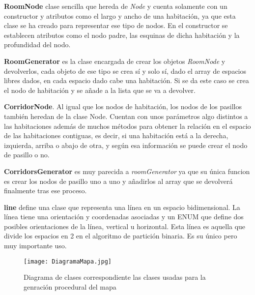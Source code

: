 \textbf{RoomNode} clase sencilla que hereda de \textit{Node} y cuenta solamente con un constructor y atributos como el largo y ancho de una habitación, ya que esta clase se ha creado para representar ese tipo de nodos. En el constructor se establecen atributos como el nodo padre, las esquinas de dicha habitación y la profundidad del nodo.

\textbf{RoomGenerator} es la clase encargada de crear los objetos \textit{RoomNode} y devolverlos, cada objeto de ese tipo se crea sí y solo sí, dado el array de espacios libres dados, en cada espacio dado cabe una habitación. Si se da este caso se crea el nodo de habitación y se añade a la lista que se va a devolver.

\textbf{CorridorNode}. Al igual que los nodos de habitación, los nodos de los pasillos también heredan de la clase Node. Cuentan con unos parámetros algo distintos a las habitaciones además de muchos métodos para obtener la relación en el espacio de las habitaciones contiguas, es decir, si una habitación está a la derecha, izquierda, arriba o abajo de otra, y según esa información se puede crear el nodo de pasillo o no.

\textbf{CorridorsGenerator} es muy parecida a \textit{roomGenerator} ya que su única funcion es crear los nodos de pasillo uno a uno y añadirlos al array que se devolverá finalmente tras ese proceso.

\textbf{line} define una clase que representa una línea en un espacio bidimensional. La línea tiene una orientación y coordenadas asociadas y un ENUM que define dos posibles orientaciones de la línea, vertical u horizontal. Esta línea es aquella que divide los espacios en 2 en el algoritmo de partición binaria. Es su único pero muy importante uso.

\begin{figure}[H]
    \centering
    \texttt{[image: DiagramaMapa.jpg]}
    \caption{Diagrama de clases correspondiente las clases usadas para la genración procedural del mapa}
\end{figure}